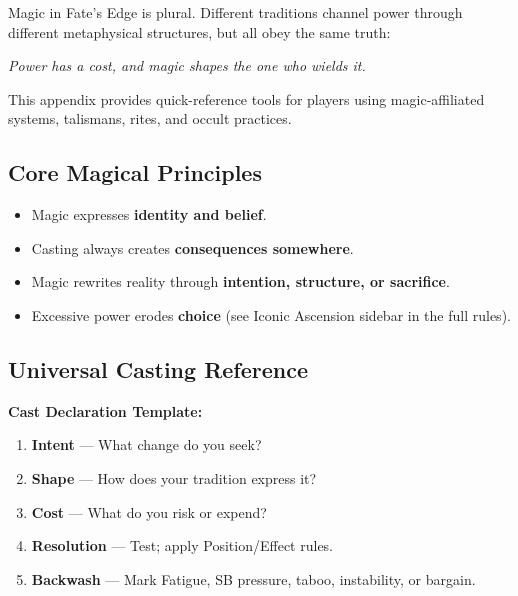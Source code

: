 Magic in Fate's Edge is plural.  
Different traditions channel power through different metaphysical structures, but all obey the same truth:

\begin{center}
\emph{Power has a cost, and magic shapes the one who wields it.}
\end{center}

This appendix provides quick-reference tools for players using magic-affiliated systems, talismans, rites, and occult practices.

\subsection{Core Magical Principles}
\begin{tcolorbox}[colback=white,colframe=black,left=1em,right=1em,breakable]
\begin{itemize}[noitemsep]
    \item Magic expresses \textbf{identity and belief}.
    \item Casting always creates \textbf{consequences somewhere}.
    \item Magic rewrites reality through \textbf{intention, structure, or sacrifice}.
    \item Excessive power erodes \textbf{choice} (see Iconic Ascension sidebar in the full rules).
\end{itemize}
\end{tcolorbox}

\subsection{Universal Casting Reference}
\begin{tcolorbox}[colback=gray!5,colframe=gray!60,breakable]
\textbf{Cast Declaration Template:}
\begin{enumerate}[noitemsep]
    \item \textbf{Intent} --- What change do you seek?
    \item \textbf{Shape} --- How does your tradition express it?
    \item \textbf{Cost} --- What do you risk or expend?
    \item \textbf{Resolution} --- Test; apply Position/Effect rules.
    \item \textbf{Backwash} --- Mark Fatigue, SB pressure, taboo, instability, or bargain.
\end{enumerate}
\end{tcolorbox}

